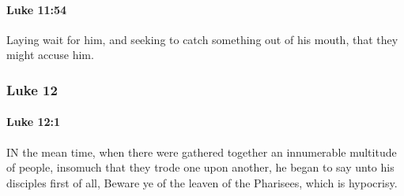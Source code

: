 		\paragraph{Luke 11:54} %
			\label{LUKE-11-54}

			Laying wait for him, and seeking to catch something out of his mouth, that they might accuse him.

			\begin{framed}
			\scriptsize
				\begin{compactdesc}
					\item[SBLG] 
				\end{compactdesc}
			\end{framed}

	\subsubsection{Luke 12} %
		\label{LUKE-12}
		
		\paragraph{Luke 12:1} %
			\label{LUKE-12-1}

			IN the mean time, when there were gathered together an innumerable multitude of people, insomuch that they trode one upon another, he began to say unto his disciples first of all, Beware ye of the leaven of the Pharisees, which is hypocrisy.

